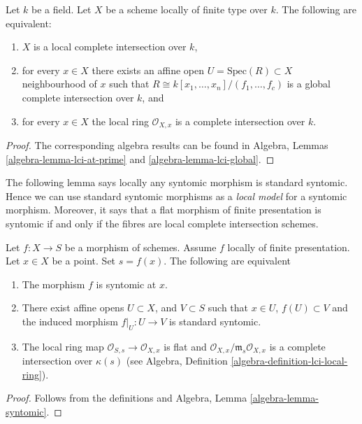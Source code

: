 \begin{lemma}
\label{lemma-local-complete-intersection}
Let $k$ be a field.
Let $X$ be a scheme locally of finite type over $k$.
The following are equivalent:
\begin{enumerate}
\item $X$ is a local complete intersection over $k$,
\item for every $x \in X$ there exists an affine open
$U = \text{Spec}(R) \subset X$ neighbourhood of $x$
such that $R \cong k[x_1, \ldots, x_n]/(f_1, \ldots, f_c)$
is a global complete intersection over $k$, and
\item for every $x \in X$ the local ring $\mathcal{O}_{X, x}$
is a complete intersection over $k$.
\end{enumerate}
\end{lemma}

\begin{proof}
The corresponding algebra results can be found in
Algebra, Lemmas \ref{algebra-lemma-lci-at-prime} and
\ref{algebra-lemma-lci-global}.
\end{proof}

\noindent
The following lemma says locally any syntomic morphism is standard syntomic.
Hence we can use standard syntomic morphisms as a {\it local model}
for a syntomic morphism. Moreover, it says that a flat morphism of finite
presentation is syntomic if and only if the fibres are local complete
intersection schemes.

\begin{lemma}
\label{lemma-syntomic-locally-standard-syntomic}
Let $f : X  \to S$ be a morphism of schemes.
Assume $f$ locally of finite presentation.
Let $x \in X$ be a point.
Set $s = f(x)$.
The following are equivalent
\begin{enumerate}
\item The morphism $f$ is syntomic at $x$.
\item There exist affine opens $U \subset X$,
and $V \subset S$ such that $x \in U$, $f(U) \subset V$ and the
induced morphism $f|_U : U \to V$ is standard syntomic.
\item The local ring map $\mathcal{O}_{S, s} \to \mathcal{O}_{X, x}$
is flat and $\mathcal{O}_{X, x}/\mathfrak m_s \mathcal{O}_{X, x}$
is a complete intersection over $\kappa(s)$ (see
Algebra, Definition \ref{algebra-definition-lci-local-ring}).
\end{enumerate}
\end{lemma}

\begin{proof}
Follows from the definitions and
Algebra, Lemma \ref{algebra-lemma-syntomic}.
\end{proof}

